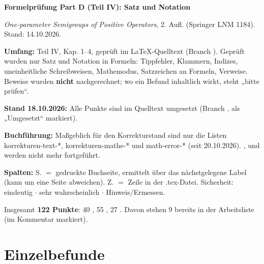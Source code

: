 \documentclass[10pt]{article}
\begin{document}
{\Large\bfseries Formelprüfung Part D (Teil IV): Satz und Notation\par}
\smallskip
\emph{One-parameter Semigroups of Positive Operators}, 2. Aufl. (Springer LNM 1184). Stand: 14.10.2026.

\textbf{Umfang:} Teil IV, Kap. 1–4, geprüft im LaTeX-Quelltext (Branch ). Geprüft wurden nur Satz und Notation in Formeln: Tippfehler, Klammern, Indizes, uneinheitliche Schreibweisen, Mathemodus, Satzzeichen an Formeln, Verweise. Beweise wurden \textbf{nicht} nachgerechnet; wo ein Befund inhaltlich wirkt, steht „bitte prüfen“.

\textbf{Stand 18.10.2026:} Alle Punkte sind im Quelltext umgesetzt (Branch , als „Umgesetzt“ markiert).

\textbf{Buchführung:} Maßgeblich für den Korrekturstand sind nur die Listen {korrekturen-text-*}, {korrekturen-mathe-*} und {math-error-*} (seit 20.10.2026). ,  und  werden nicht mehr fortgeführt.

\textbf{Spalten:} S. $=$ gedruckte Buchseite, ermittelt über das nächstgelegene Label (kann um eine Seite abweichen). Z. $=$ Zeile in der .tex-Datei. Sicherheit: \sichA{} eindeutig $\ensuremath{\cdot}$ \sichB{} sehr wahrscheinlich $\ensuremath{\cdot}$ \sichC{} Hinweis/Ermessen.

Insgesamt \textbf{122 Punkte}: 40 \sichA{}, 55 \sichB{}, 27 \sichC{}. Davon stehen 9 bereits in der Arbeitsliste  (im Kommentar markiert).

\section*{Einzelbefunde}
\end{document}
